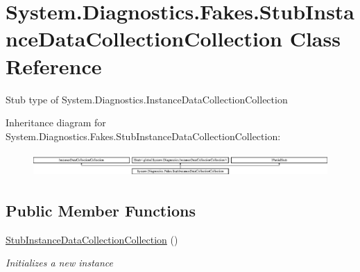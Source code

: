 \hypertarget{class_system_1_1_diagnostics_1_1_fakes_1_1_stub_instance_data_collection_collection}{\section{System.\-Diagnostics.\-Fakes.\-Stub\-Instance\-Data\-Collection\-Collection Class Reference}
\label{class_system_1_1_diagnostics_1_1_fakes_1_1_stub_instance_data_collection_collection}
}


Stub type of System.\-Diagnostics.\-Instance\-Data\-Collection\-Collection 


Inheritance diagram for System.\-Diagnostics.\-Fakes.\-Stub\-Instance\-Data\-Collection\-Collection\-:\begin{figure}[H]
\begin{center}
\leavevmode
\includegraphics[height=0.915033cm]{class_system_1_1_diagnostics_1_1_fakes_1_1_stub_instance_data_collection_collection}
\end{center}
\end{figure}
\subsection*{Public Member Functions}
\begin{DoxyCompactItemize}
\item 
\hyperlink{class_system_1_1_diagnostics_1_1_fakes_1_1_stub_instance_data_collection_collection_a427c6614143951f07227924f9ad66609}{Stub\-Instance\-Data\-Collection\-Collection} ()
\begin{DoxyCompactList}\small\item\em Initializes a new instance\end{DoxyCompactList}\end{DoxyCompactItemize}
